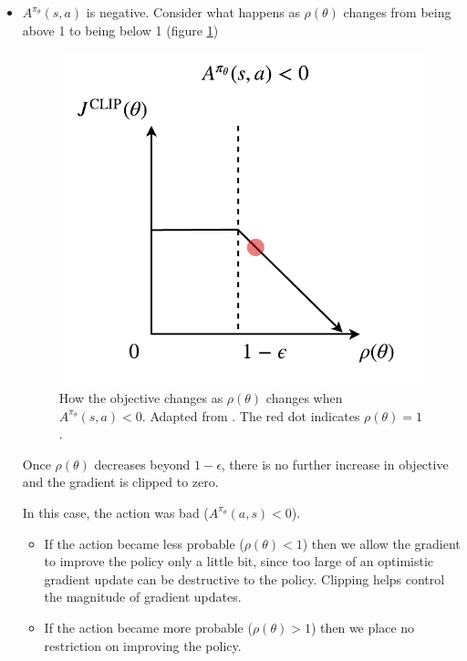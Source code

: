 \documentclass[journal, onecolumn, 12pt, draftclsnofoot]{IEEEtran}
\begin{document}
\begin{itemize}
\begin{itemize}
			\end{itemize}
			\item $A^{\pi_\theta}(s,a)$ is negative. Consider what happens as $\rho(\theta)$ changes from being above 1 to being below 1 (figure \ref{fig:clipped-objective-a-ltz})
			\begin{figure}[ht]
				\begin{center}
				\includegraphics[scale=0.75]{fig/clipped-objective-a-ltz.pdf}
			\end{center}
				\caption{How the objective changes as $\rho(\theta)$ changes when $A^{\pi_\theta}(s,a) < 0$. Adapted from \cite{ppo}. The red dot indicates $\rho(\theta) = 1$.}
				\label{fig:clipped-objective-a-ltz}
			\end{figure}
			Once $\rho(\theta)$ decreases beyond $1 - \epsilon$, there is no further increase in objective and the gradient is clipped to zero.
			\par In this case, the action was bad ($A^{\pi_\theta}(a,s) < 0$).
			\begin{itemize}
				\item If the action became less probable ($\rho(\theta) < 1$) then we allow the gradient to improve the policy only a little bit, since too large of an optimistic gradient update can be destructive to the policy. Clipping helps control the magnitude of gradient updates.
				\item  If the action became more probable ($\rho(\theta) > 1$) then we place no restriction on improving the policy.
			\end{itemize}
		\end{itemize}
\end{document}
